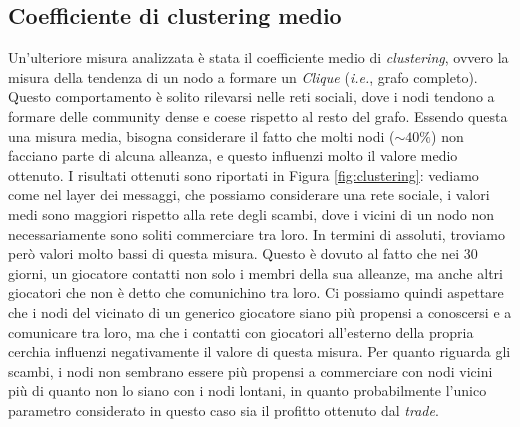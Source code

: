 \newpage
\subsection{Coefficiente di clustering medio}
Un'ulteriore misura analizzata è stata il coefficiente medio di \textit{clustering}, ovvero la misura della tendenza di un nodo a formare un \textit{Clique} (\textit{i.e.}, grafo completo). Questo comportamento è solito rilevarsi nelle reti sociali, dove i nodi tendono a formare delle community dense e coese rispetto al resto del grafo. Essendo questa una misura media, bisogna considerare il fatto che molti nodi ($\sim40\%$) non facciano parte di alcuna alleanza, e questo influenzi molto il valore medio ottenuto. 
I risultati ottenuti sono riportati in Figura \ref{fig:clustering}: vediamo come nel layer dei messaggi, che possiamo considerare una rete sociale, i valori medi sono  maggiori rispetto alla rete degli scambi, dove i vicini di un nodo non necessariamente sono soliti commerciare tra loro. In termini di assoluti, troviamo però valori molto bassi di questa misura. Questo è dovuto al fatto che nei 30 giorni, un giocatore contatti non solo i membri della sua alleanze, ma anche altri giocatori che non è detto che comunichino tra loro. Ci possiamo quindi aspettare che i nodi del vicinato di un generico giocatore siano più propensi a conoscersi e a comunicare tra loro, ma che i contatti con giocatori all'esterno della propria cerchia influenzi negativamente il valore di questa misura. Per quanto riguarda gli scambi, i nodi non sembrano essere più propensi a commerciare con nodi vicini più di quanto non lo siano con i nodi lontani, in quanto probabilmente l'unico parametro considerato in questo caso sia il profitto ottenuto dal \textit{trade}.
